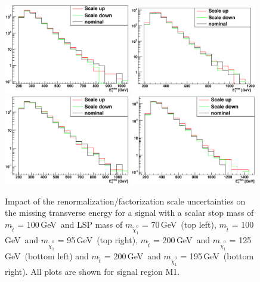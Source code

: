 \begin{figure}[tb]
\begin{center}
  \includegraphics[width=0.49\textwidth]{Interpretations/Figures/stop_100_70_factScale.eps}
  \includegraphics[width=0.49\textwidth]{Interpretations/Figures/stop_100_95_factScale.eps}
  \includegraphics[width=0.49\textwidth]{Interpretations/Figures/stop_200_125_factScale.eps}
  \includegraphics[width=0.49\textwidth]{Interpretations/Figures/stop_200_195_factScale.eps}
\end{center}
\caption[Impact of the renormalization/factorization scale uncertainties on several signal models.]{Impact of the renormalization/factorization scale uncertainties on the missing transverse
  energy for a signal with a scalar
  stop mass of $m_{\tilde{t}}$ = 100\,GeV\ and LSP mass of
  $m_{\tilde{\chi}^0_1}$ = 70\,GeV\ (top left), $m_{\tilde{t}}$ = 100\,GeV\ and
  $m_{\tilde{\chi}^0_1}$ = 95\,GeV\ (top right), $m_{\tilde{t}}$ = 200\,GeV\ and
  $m_{\tilde{\chi}^0_1}$ = 125\,GeV\ (bottom left) and $m_{\tilde{t}}$ = 200\,GeV\ and
  $m_{\tilde{\chi}^0_1}$ = 195\,GeV\ (bottom right).  All plots are
  shown for signal region M1.} 
\label{fig:signalscalesysta6}
\end{figure}

